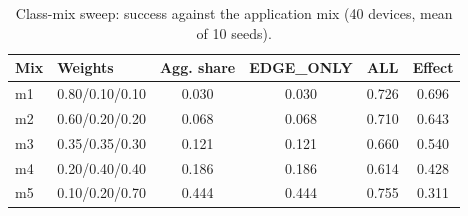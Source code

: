 \begin{table}[t]
\centering
\footnotesize
\caption{Class-mix sweep: success against the application mix (40 devices, mean of 10 seeds).}
\label{tab:p1-mix}
\begin{tabular}{llcccc}
\toprule
Mix & Weights & Agg. share & EDGE\_ONLY & ALL & Effect \\
\midrule
m1 & 0.80/0.10/0.10 & 0.030 & 0.030 & 0.726 & 0.696 \\
m2 & 0.60/0.20/0.20 & 0.068 & 0.068 & 0.710 & 0.643 \\
m3 & 0.35/0.35/0.30 & 0.121 & 0.121 & 0.660 & 0.540 \\
m4 & 0.20/0.40/0.40 & 0.186 & 0.186 & 0.614 & 0.428 \\
m5 & 0.10/0.20/0.70 & 0.444 & 0.444 & 0.755 & 0.311 \\
\bottomrule
\end{tabular}
\par\vspace{2pt}{\footnotesize\raggedright EDGE\_ONLY tracks the aggregation share of the mix, which is the share whose deadline exceeds the control interval.\par}
\end{table}
